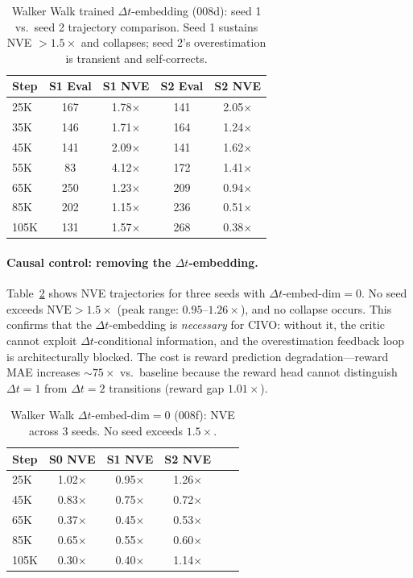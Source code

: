 \documentclass[10pt,letterpaper]{article}
\newcommand{\dt}{\Delta t}
\newcommand{\nve}{\mathrm{NVE}}
\begin{document}
\begin{table}[h]
\centering
\caption{Walker Walk trained $\dt$-embedding (008d): seed 1 vs.\ seed 2 trajectory comparison. Seed 1 sustains NVE $> 1.5\times$ and collapses; seed 2's overestimation is transient and self-corrects.}
\label{tab:walker_trained}
\small
\begin{tabular}{lcccc}
\toprule
Step & S1 Eval & S1 NVE & S2 Eval & S2 NVE \\
\midrule
25K  & 167 & 1.78$\times$ & 141 & 2.05$\times$ \\
35K  & 146 & 1.71$\times$ & 164 & 1.24$\times$ \\
45K  & 141 & 2.09$\times$ & 141 & 1.62$\times$ \\
55K  &  83 & 4.12$\times$ & 172 & 1.41$\times$ \\
65K  & 250 & 1.23$\times$ & 209 & 0.94$\times$ \\
85K  & 202 & 1.15$\times$ & 236 & 0.51$\times$ \\
105K & 131 & 1.57$\times$ & 268 & 0.38$\times$ \\
\bottomrule
\end{tabular}
\end{table}

\paragraph{Causal control: removing the $\dt$-embedding.}
Table~\ref{tab:walker_nodtemb} shows NVE trajectories for three seeds with $\dt$-embed-dim$=$0.
No seed exceeds $\nve > 1.5\times$ (peak range: $0.95$--$1.26\times$), and no collapse occurs.
This confirms that the $\dt$-embedding is \emph{necessary} for CIVO: without it, the critic cannot exploit $\dt$-conditional information, and the overestimation feedback loop is architecturally blocked.
The cost is reward prediction degradation---reward MAE increases ${\sim}75\times$ vs.\ baseline because the reward head cannot distinguish $\dt{=}1$ from $\dt{=}2$ transitions (reward gap $1.01\times$).

\begin{table}[h]
\centering
\caption{Walker Walk $\dt$-embed-dim$=$0 (008f): NVE across 3 seeds. No seed exceeds $1.5\times$.}
\label{tab:walker_nodtemb}
\small
\begin{tabular}{lccccc}
\toprule
Step & S0 NVE & S1 NVE & S2 NVE \\
\midrule
25K  & 1.02$\times$ & 0.95$\times$ & 1.26$\times$ \\
45K  & 0.83$\times$ & 0.75$\times$ & 0.72$\times$ \\
65K  & 0.37$\times$ & 0.45$\times$ & 0.53$\times$ \\
85K  & 0.65$\times$ & 0.55$\times$ & 0.60$\times$ \\
105K & 0.30$\times$ & 0.40$\times$ & 1.14$\times$ \\
\bottomrule
\end{tabular}
\end{table}
\end{document}
